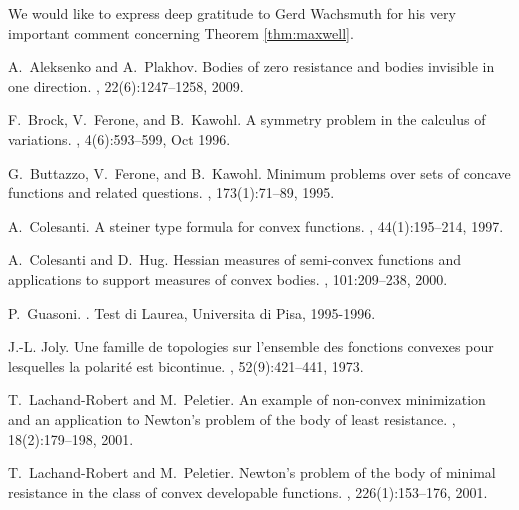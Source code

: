 \documentclass[14pt]{extarticle}
\theoremstyle{remark}
\theoremstyle{definition}
\begin{document}
\bigskip 

We would like to express deep gratitude to Gerd Wachsmuth for his very important comment concerning Theorem \ref{thm:maxwell}.


%


\begin{thebibliography}{10}

A.~Aleksenko and A.~Plakhov.
\newblock Bodies of zero resistance and bodies invisible in one direction.
, 22(6):1247--1258, 2009.

F.~Brock, V.~Ferone, and B.~Kawohl.
\newblock A symmetry problem in the calculus of variations.
,
  4(6):593--599, Oct 1996.

G.~Buttazzo, V.~Ferone, and B.~Kawohl.
\newblock Minimum problems over sets of concave functions and related
  questions.
, 173(1):71--89, 1995.

A.~Colesanti.
\newblock A steiner type formula for convex functions.
, 44(1):195--214, 1997.

A.~Colesanti and D.~Hug.
\newblock Hessian measures of semi-convex functions and applications to support
  measures of convex bodies.
, 101:209--238, 2000.

P.~Guasoni.
.
\newblock Test di Laurea, Universita di Pisa, 1995-1996.

J.-L. Joly.
\newblock Une famille de topologies sur l'ensemble des fonctions convexes pour
  lesquelles la polarit\'e est bicontinue.
, 52(9):421--441, 1973.

T.~Lachand-Robert and M.~Peletier.
\newblock An example of non-convex minimization and an application to
  {Newton}'s problem of the body of least resistance.
,
  18(2):179--198, 2001.

T.~Lachand-Robert and M.~Peletier.
\newblock Newton's problem of the body of minimal resistance in the class of
  convex developable functions.
, 226(1):153--176, 2001.


\end{thebibliography}
\end{document}
